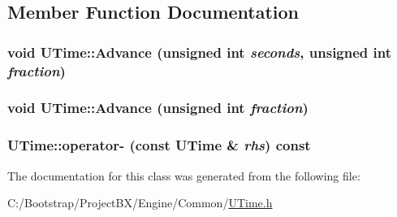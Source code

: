 \subsection{Member Function Documentation}
\hypertarget{class_u_time_3a873fb7b8609348fbe0b0ce96b146eb}{
\subsubsection[{Advance}]{\setlength{\rightskip}{0pt plus 5cm}void UTime::Advance (unsigned int {\em seconds}, \/  unsigned int {\em fraction})}}
\label{class_u_time_3a873fb7b8609348fbe0b0ce96b146eb}


\hypertarget{class_u_time_4692044217515a78c8591f7a19089bd2}{
\subsubsection[{Advance}]{\setlength{\rightskip}{0pt plus 5cm}void UTime::Advance (unsigned int {\em fraction})}}
\label{class_u_time_4692044217515a78c8591f7a19089bd2}


\hypertarget{class_u_time_54c2c650fefff5a7eab2a35ff8391a17}{
\subsubsection[{operator-}]{ UTime::operator- (const {\bf UTime} \& {\em rhs}) const}}
\label{class_u_time_54c2c650fefff5a7eab2a35ff8391a17}




The documentation for this class was generated from the following file:\begin{CompactItemize}
\item 
C:/Bootstrap/ProjectBX/Engine/Common/\hyperlink{_u_time_8h}{UTime.h}\end{CompactItemize}

